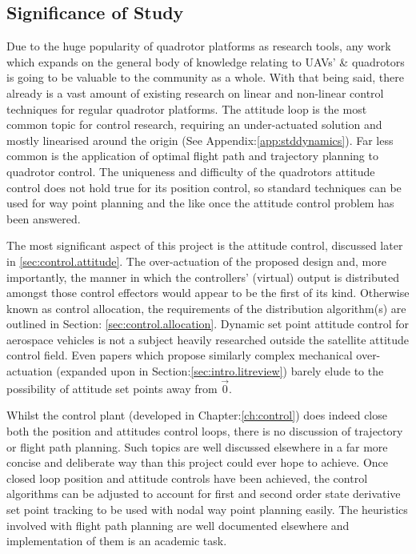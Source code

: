 \subsection{Significance of Study}
\label{subsec:intro.foreword.significance}
Due to the huge popularity of quadrotor platforms as research tools, any work which expands on the general body of knowledge relating to UAVs' \& quadrotors is going to be valuable to the community as a whole. With that being said, there already is a vast amount of existing research on linear and non-linear control techniques for regular quadrotor platforms. The attitude loop is the most common topic for control research, requiring an under-actuated solution and mostly linearised around the origin (See Appendix:\ref{app:stddynamics}). Far less common is the application of optimal flight path and trajectory planning to quadrotor control. The uniqueness and difficulty of the quadrotors attitude control does not hold true for its position control, so standard techniques can be used for way point planning and the like once the attitude control problem has been answered.
\par
The most significant aspect of this project is the attitude control, discussed later in \ref{sec:control.attitude}. The over-actuation of the proposed design and, more importantly, the manner in which the controllers' (virtual) output is distributed amongst those control effectors would appear to be the first of its kind. Otherwise known as control allocation, the requirements of the distribution algorithm(s) are outlined in Section: \ref{sec:control.allocation}. Dynamic set point attitude control for aerospace vehicles is not a subject heavily researched outside the satellite attitude control field. Even papers which propose similarly complex mechanical over-actuation (expanded upon in Section:\ref{sec:intro.litreview}) barely elude to the possibility of attitude set points away from $\vec{0}$.
\par
Whilst the control plant (developed in Chapter:\ref{ch:control}) does indeed close both the position  and attitudes control loops, there is no discussion of trajectory or flight path planning. Such topics are well discussed elsewhere in a far more concise and deliberate way than this project could ever hope to achieve. Once closed loop position and attitude controls have been achieved, the control algorithms can be adjusted to account for first and second order state derivative set point tracking to be used with nodal way point planning easily. The heuristics involved with flight path planning are well documented elsewhere and implementation of them is an academic task.
